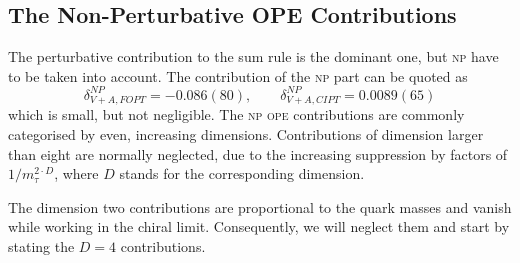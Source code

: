 \documentclass[../../index.tex]{subfiles}
\begin{document}
\subsection{The Non-Perturbative OPE Contributions}
The perturbative contribution to the sum rule is the dominant one, but
\textsc{np} have to be taken into account. The contribution of the \textsc{np}
part can be quoted as \cite{Jamin2013}
\begin{equation}
  \delta_{V+A,FOPT}^{NP} = -0.086(80), \qquad \delta_{V+A,CIPT}^{NP} = 0.0089(65)
\end{equation}
which is small, but not negligible. The \textsc{np} \textsc{ope} contributions
are commonly categorised by even, increasing dimensions. Contributions of
dimension larger than eight are normally neglected, due to the increasing
suppression by factors of \(1/m_\tau^{2\cdot D}\), where \(D\) stands for the
corresponding dimension.

The dimension two contributions are proportional to the quark masses and vanish
while working in the chiral limit. Consequently, we will neglect them and start
by stating the \(D=4\) contributions.
\end{document}
